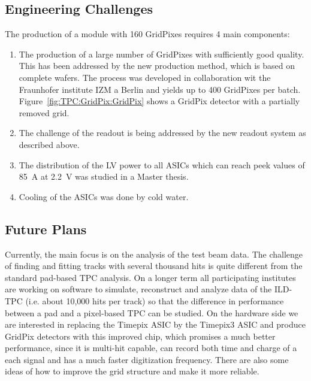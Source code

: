 \subsection{Engineering Challenges}
The production of a module with 160 GridPixes requires 4 main components:
\begin{enumerate}
	\item The production of a large number of GridPixes with sufficiently good quality. This has been addressed by the new production method, which is based on complete wafers. The process was developed in collaboration wit the Fraunhofer institute IZM a Berlin and yields up to 400 GridPixes per batch. Figure~\ref{fig:TPC:GridPix:GridPix} shows a GridPix detector with a partially removed grid.
	\item The challenge of the readout is being addressed by the new readout system as described above.
	\item The distribution of the LV power to all ASICs which can reach peek values of \SI{85}{A} at \SI{2.2}{V} was studied in a Master thesis.
	\item Cooling of the ASICs was done by cold water.
\end{enumerate}


\subsection{Future Plans}
Currently, the main focus is on the analysis of the test beam data. The challenge of finding and fitting tracks with several thousand hits is quite different from the standard pad-based TPC analysis. On a longer term all participating institutes are working on software to simulate, reconstruct and analyze data of the ILD-TPC (i.e. about 10,000 hits per track) so that the difference in performance between a pad and a pixel-based TPC can be studied.
On the hardware side we are interested in replacing the Timepix ASIC by the Timepix3 ASIC and produce GridPix detectors with this improved chip, which promises a much better performance, since it is multi-hit capable, can record both time and charge of a each signal and has a much faster digitization frequency. There are also some ideas of how to improve the grid structure and make it more reliable.
